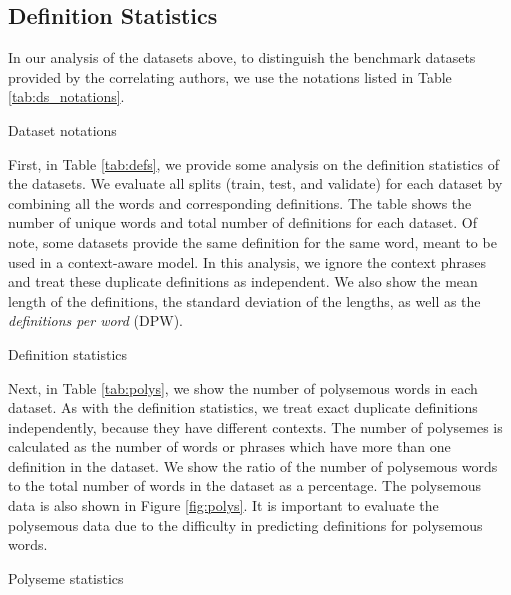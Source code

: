 \subsection{Definition Statistics}

In our analysis of the datasets above, to distinguish the benchmark datasets
provided by the correlating authors, we use the notations listed in Table
\ref{tab:ds_notations}.

\begin{table}[h]
    \centering
    \caption{Dataset notations}
    
    \label{tab:ds_notations}
\end{table}

First, in Table \ref{tab:defs}, we provide some analysis on the definition
statistics of the datasets. We evaluate all splits (train, test, and validate)
for each dataset by combining all the words and corresponding definitions. The
table shows the number of unique words and total number of definitions for each
dataset. Of note, some datasets provide the same definition for the same word,
meant to be used in a context-aware model. In this analysis, we ignore the
context phrases and treat these duplicate definitions as independent. We also
show the mean length of the definitions, the standard deviation of the lengths,
as well as the \textit{definitions per word} (DPW).

\begin{table}
    \centering
    \caption{Definition statistics}
    
    \label{tab:defs}
\end{table}

Next, in Table \ref{tab:polys}, we show the number of polysemous words in each
dataset. As with the definition statistics, we treat exact duplicate definitions
independently, because they have different contexts. The number of polysemes is
calculated as the number of words or phrases which have more than one definition
in the dataset. We show the ratio of the number of polysemous words to the total
number of words in the dataset as a percentage. The polysemous data is also
shown in Figure \ref{fig:polys}.  It is important to evaluate the polysemous
data due to the difficulty in predicting definitions for polysemous words.

\begin{table}
    \centering
    \caption{Polyseme statistics}
    
    \label{tab:polys}
\end{table}

